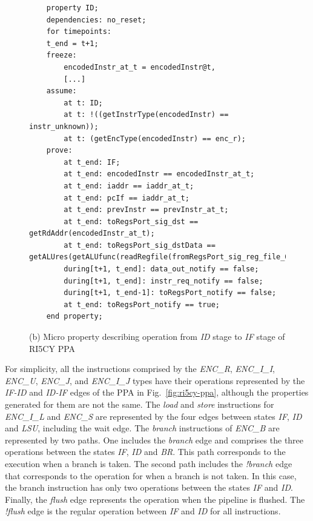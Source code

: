 \begin{figure}[htb]
\ContinuedFloat
    \begin{lstlisting}
    property ID;
    dependencies: no_reset;
    for timepoints:
    t_end = t+1;
    freeze:
        encodedInstr_at_t = encodedInstr@t,
        [...]
    assume:
        at t: ID;
        at t: !((getInstrType(encodedInstr) == instr_unknown));
        at t: (getEncType(encodedInstr) == enc_r);
    prove:
        at t_end: IF;
        at t_end: encodedInstr == encodedInstr_at_t;
        at t_end: iaddr == iaddr_at_t;
        at t_end: pcIf == iaddr_at_t;
        at t_end: prevInstr == prevInstr_at_t;
        at t_end: toRegsPort_sig_dst == getRdAddr(encodedInstr_at_t);
        at t_end: toRegsPort_sig_dstData == getALUres(getALUfunc(readRegfile(fromRegsPort_sig_reg_file_01_at_t,...),getRs1Addr(),getRs2Addr());
        during[t+1, t_end]: data_out_notify == false;
        during[t+1, t_end]: instr_req_notify == false;
        during[t+1, t_end-1]: toRegsPort_notify == false;
        at t_end: toRegsPort_notify == true;
    end property;\end{lstlisting}
    \caption{(b) Micro property describing operation from \textit{ID} stage to \textit{IF} stage of RI5CY PPA}
    \label{fig:ri5cy-if-id-micro-ppt-b}
\end{figure}

For simplicity, all the instructions comprised by the \textit{ENC\_R}, \textit{ENC\_I\_I}, \textit{ENC\_U}, \textit{ENC\_J}, and \textit{ENC\_I\_J} types have their operations represented by the \textit{IF-ID} and \textit{ID-IF} edges of the PPA in Fig.~\ref{fig:ri5cy-ppa}, although the properties generated for them are not the same. The \textit{load} and \textit{store} instructions for \textit{ENC\_I\_L} and \textit{ENC\_S} are represented by the four edges between states \textit{IF}, \textit{ID} and \textit{LSU}, including the wait edge. The \textit{branch} instructions of \textit{ENC\_B} are represented by two paths. One includes the \textit{branch} edge and comprises the three operations between the states \textit{IF}, \textit{ID} and \textit{BR}. This path corresponds to the execution when a branch is taken. The second path includes the \textit{!branch} edge that corresponds to the operation for when a branch is not taken. In this case, the branch instruction has only two operations between the states \textit{IF} and \textit{ID}. Finally, the \textit{flush} edge represents the operation when the pipeline is flushed. The \textit{!flush} edge is the regular operation between \textit{IF} and \textit{ID} for all instructions.

